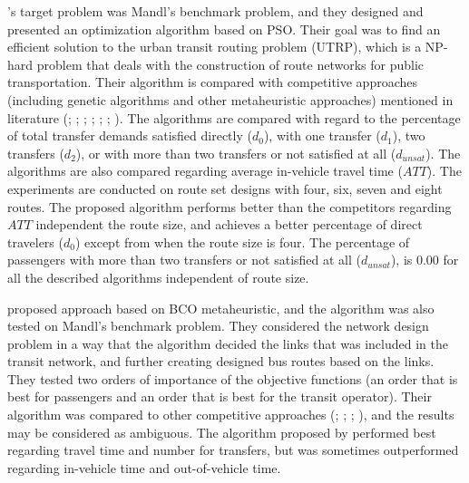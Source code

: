 \citet{kechagiopoulos14}'s target problem was Mandl's benchmark problem, and they designed and presented an optimization algorithm based on PSO. Their goal was to find an efficient solution to the urban transit routing problem (UTRP), which is a NP-hard problem that deals with the construction of route networks for public transportation. Their algorithm is compared with competitive approaches (including genetic algorithms and other metaheuristic approaches) mentioned in literature (\citet{baaj91}; \citet{chakroborty02}; \citet{kidwai98}; \citet{fan10}; \citet{fan09-2}; \citet{zhang10}; \citet{chew12}). The algorithms are compared with regard to the percentage of total transfer demands satisfied directly ($d_0$), with one transfer ($d_1$), two transfers ($d_2$), or with more than two transfers or not satisfied at all ($d_{unsat}$). The algorithms are also compared regarding average in-vehicle travel time ($ATT$). The experiments are conducted on route set designs with four, six, seven and eight routes. The proposed algorithm performs better than the competitors regarding $ATT$ independent the route size, and achieves a better percentage of direct travelers ($d_0$) except from when the route size is four. The percentage of passengers with more than two transfers or not satisfied at all ($d_{unsat}$), is $0.00$ for all the described algorithms independent of route size.\par
\citet{nikolic14} proposed approach based on BCO metaheuristic, and the algorithm was also tested on Mandl's benchmark problem. They considered the network design problem in a way that the algorithm decided the links that was included in the transit network, and further creating designed bus routes based on the links. They tested two orders of importance of the objective functions (an order that is best for passengers and an order that is best for the transit operator). Their algorithm was compared to other competitive approaches (\citet{mandl80}; \citet{shih94}; \citet{baaj95}; \citet{bagloee11}), and the results may be considered as ambiguous. The algorithm proposed by \citet{nikolic14} performed best regarding travel time and number for transfers, but was sometimes outperformed regarding in-vehicle time and out-of-vehicle time. 
\newline
